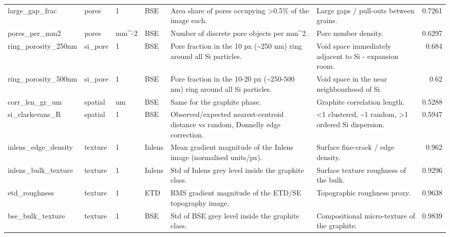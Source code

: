 \documentclass[11pt,a4paper]{article}
\begin{document}
\begin{longtable}{llllp{4.6cm}p{4.2cm}r}
large\_gap\_frac & pores & 1 & BSE & Area share of pores occupying >0.5\% of the image each. & Large gaps / pull-outs between grains. & 0.7261 \\
pores\_per\_mm2 & pores & mm\textasciicircum -2 & BSE & Number of discrete pore objects per mm\textasciicircum 2. & Pore number density. & 0.6297 \\
ring\_porosity\_250nm & si\_pore & 1 & BSE & Pore fraction in the 10 px (\textasciitilde 250 nm) ring around all Si particles. & Void space immediately adjacent to Si - expansion room. & 0.684 \\
ring\_porosity\_500nm & si\_pore & 1 & BSE & Pore fraction in the 10-20 px (\textasciitilde 250-500 nm) ring around all Si particles. & Void space in the near neighbourhood of Si. & 0.62 \\
corr\_len\_gr\_um & spatial & um & BSE & Same for the graphite phase. & Graphite correlation length. & 0.5288 \\
si\_clarkevans\_R & spatial & 1 & BSE & Observed/expected nearest-centroid distance vs random, Donnelly edge correction. & <1 clustered, \textasciitilde 1 random, >1 ordered Si dispersion. & 0.5947 \\
inlens\_edge\_density & texture & 1 & Inlens & Mean gradient magnitude of the Inlens image (normalised units/px). & Surface fine-crack / edge density. & 0.962 \\
inlens\_bulk\_texture & texture & 1 & Inlens & Std of Inlens grey level inside the graphite class. & Surface texture roughness of the bulk. & 0.9296 \\
etd\_roughness & texture & 1 & ETD & RMS gradient magnitude of the ETD/SE topography image. & Topographic roughness proxy. & 0.9638 \\
bse\_bulk\_texture & texture & 1 & BSE & Std of BSE grey level inside the graphite class. & Compositional micro-texture of the graphite. & 0.9839 \\
\end{longtable}
\normalsize
\scriptsize
\end{document}
